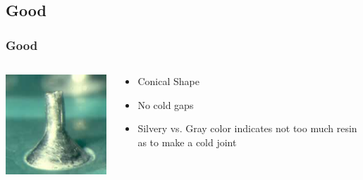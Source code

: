 \documentclass{beamer}
\begin{document}
\subsection{Good}
\begin{frame}
  \frametitle{Good}
  \begin{columns}
    \begin{column}{5cm}
      \includegraphics{images/good_joint.jpg}
    \end{column}
    \vspace{3cm}
    \begin{column}{5cm}
      \begin{itemize}
        \item Conical Shape
        \item No cold gaps
        \item Silvery vs. Gray color indicates not too much resin as to make a cold joint
      \end{itemize}
    \end{column}
  \end{columns}
\end{frame}
\end{document}
